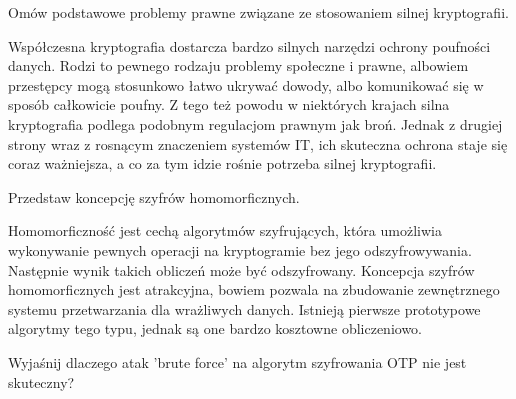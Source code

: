 \documentclass[answers,11pt]{exam}
\begin{document}
\begin{questions}
\question Omów podstawowe problemy prawne związane ze stosowaniem silnej kryptografii.
\begin{solution}
Współczesna kryptografia dostarcza bardzo silnych narzędzi ochrony poufności danych. Rodzi to pewnego rodzaju problemy społeczne i prawne, albowiem przestępcy mogą stosunkowo łatwo ukrywać dowody, albo komunikować się w sposób całkowicie poufny. Z tego też powodu w niektórych krajach silna kryptografia podlega podobnym regulacjom prawnym jak broń. Jednak z drugiej strony wraz z rosnącym znaczeniem systemów IT, ich skuteczna ochrona staje się coraz ważniejsza, a co za tym idzie rośnie potrzeba silnej kryptografii.
\end{solution}

\question Przedstaw koncepcję szyfrów homomorficznych.
\begin{solution}
Homomorficzność jest cechą algorytmów szyfrujących, która umożliwia wykonywanie pewnych operacji na kryptogramie bez jego odszyfrowywania. Następnie wynik takich obliczeń może być  odszyfrowany. Koncepcja szyfrów homomorficznych jest atrakcyjna, bowiem pozwala na zbudowanie zewnętrznego systemu przetwarzania dla wrażliwych danych. Istnieją pierwsze prototypowe algorytmy tego typu, jednak są one bardzo kosztowne obliczeniowo.
\end{solution}

\question Wyjaśnij dlaczego atak 'brute force' na algorytm szyfrowania OTP nie jest skuteczny?
\begin{solution}
\end{solution}


\end{questions}
\end{document}
